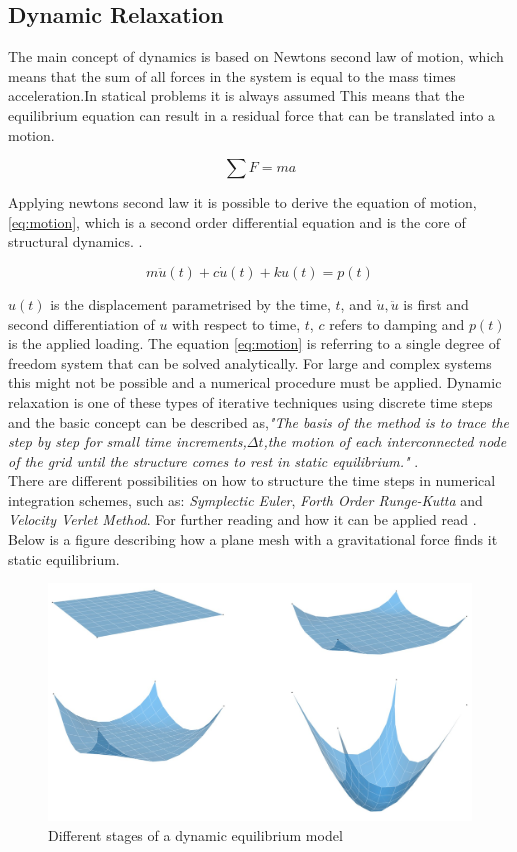 \subsection{Dynamic Relaxation}\label{DR}

The main concept of dynamics is based on Newtons second law of motion, which means that the sum of all forces in the system is equal to the mass times acceleration.In statical problems it is always assumed  This means that the equilibrium equation can result in a residual force that can be translated into a motion.

\begin{equation}
\sum F = ma
\end{equation}

Applying newtons second law it is possible to derive the equation of motion, \ref{eq:motion}, which is a second order differential equation and is the core of structural dynamics. \cite{ref:Dynamics}.

\begin{equation} \label{eq:motion}
 m\ddot{u}(t) + c\dot{u}(t) + ku(t) = p(t)
\end{equation}


$u(t)$ is the displacement parametrised by the time, $t$, and $\dot{u},\ddot{u}$ is first and second differentiation of $u$ with respect to time, $t$, $c$ refers to damping and $p(t)$ is the applied loading. The equation \ref{eq:motion} is referring to a single degree of freedom system that can be solved analytically. For large and complex systems this might not be possible and a numerical procedure must be applied. Dynamic relaxation is one of these types of iterative techniques using discrete time steps and the basic concept can be described as,\textit{"The basis of the method is to trace the step by step for small time increments,$\Delta t$,the motion of each interconnected node of the grid until the structure comes to rest in static equilibrium."} \cite{ref:ShellOpt}.\\
There are different possibilities on how to structure the time steps in numerical integration schemes, such as: \textit{Symplectic Euler},\textit{ Forth Order Runge-Kutta} and \textit{Velocity Verlet Method}. For further reading and how it can be applied read \cite{ref:Poulsen}. Below is a figure describing how a plane mesh with a gravitational force finds it static equilibrium.

\begin{figure}[H] 
\centering
\includegraphics[width=0.8\linewidth ]{figure/Theory/PartSpring.jpg}
\caption{Different stages of a dynamic equilibrium model }
\label{fig:DR}
\end{figure}

